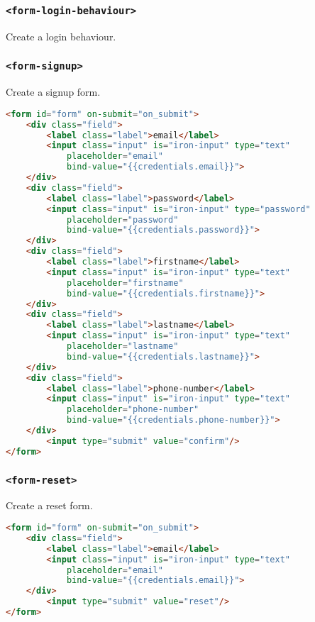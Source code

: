 \subsubsection{\texttt{<form-login-behaviour>}} 

Create a login behaviour.

\subsubsection{\texttt{<form-signup>}}

Create a signup form.
\begin{lstlisting}[language=html]
<form id="form" on-submit="on_submit">
    <div class="field">
        <label class="label">email</label>
        <input class="input" is="iron-input" type="text" 
    		placeholder="email" 
            bind-value="{{credentials.email}}">
    </div>
    <div class="field">
        <label class="label">password</label>
        <input class="input" is="iron-input" type="password" 
        	placeholder="password" 
        	bind-value="{{credentials.password}}">
    </div>
    <div class="field">
        <label class="label">firstname</label>
        <input class="input" is="iron-input" type="text" 
        	placeholder="firstname" 
        	bind-value="{{credentials.firstname}}">
    </div>
    <div class="field">
        <label class="label">lastname</label>
        <input class="input" is="iron-input" type="text" 
        	placeholder="lastname" 
        	bind-value="{{credentials.lastname}}">
    </div>
    <div class="field">
        <label class="label">phone-number</label>
        <input class="input" is="iron-input" type="text" 
        	placeholder="phone-number" 
        	bind-value="{{credentials.phone-number}}">
    </div>
      	<input type="submit" value="confirm"/>
</form>
\end{lstlisting}


\subsubsection{\texttt{<form-reset>}}

Create a reset form.
\begin{lstlisting}[language=html]
<form id="form" on-submit="on_submit">
    <div class="field">
        <label class="label">email</label>
        <input class="input" is="iron-input" type="text" 
    		placeholder="email" 
            bind-value="{{credentials.email}}">
    </div>
      	<input type="submit" value="reset"/>
</form>
\end{lstlisting}


